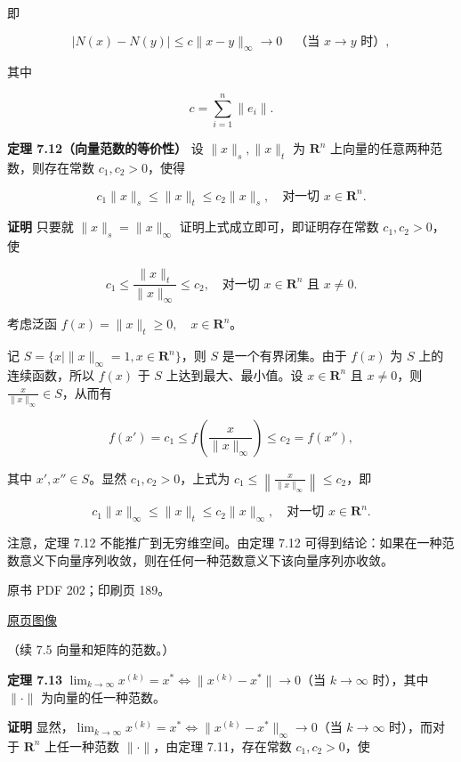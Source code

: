 \documentclass[
  10pt,
  fontset=fandol]{ctexart}
\begin{document}
即

\[
|N(x)-N(y)|\leqslant c\|x-y\|_\infty\to0\quad\text{（当 }x\to y\text{ 时）},
\]

其中

\[
c=\sum_{i=1}^{n}\|e_i\|.
\]

\textbf{定理 7.12（向量范数的等价性）} 设 \(\|x\|_s,\|x\|_t\) 为
\(\mathbf R^n\) 上向量的任意两种范数，则存在常数 \(c_1,c_2>0\)，使得

\[
c_1\|x\|_s\leqslant\|x\|_t\leqslant c_2\|x\|_s,\quad\text{对一切 }x\in\mathbf R^n.
\]

\textbf{证明} 只要就 \(\|x\|_s=\|x\|_\infty\)
证明上式成立即可，即证明存在常数 \(c_1,c_2>0\)，使

\[
c_1\leqslant\frac{\|x\|_t}{\|x\|_\infty}\leqslant c_2,\quad\text{对一切 }x\in\mathbf R^n\text{ 且 }x\neq0.
\]

考虑泛函 \(f(x)=\|x\|_t\geqslant0,\quad x\in\mathbf R^n\)。

记 \(S=\{x\mid\|x\|_\infty=1,x\in\mathbf R^n\}\)，则 \(S\)
是一个有界闭集。由于 \(f(x)\) 为 \(S\) 上的连续函数，所以 \(f(x)\) 于
\(S\) 上达到最大、最小值。设 \(x\in\mathbf R^n\) 且 \(x\neq0\)，则
\(\frac{x}{\|x\|_\infty}\in S\)，从而有

\[
f(x')=c_1\leqslant f\left(\frac{x}{\|x\|_\infty}\right)\leqslant c_2=f(x''),
\tag{7.5.3}
\]

其中 \(x',x''\in S\)。显然 \(c_1,c_2>0\)，上式为
\(c_1\leqslant\left\|\frac{x}{\|x\|_\infty}\right\|\leqslant c_2\)，即

\[
c_1\|x\|_\infty\leqslant\|x\|_t\leqslant c_2\|x\|_\infty,\quad\text{对一切 }x\in\mathbf R^n.
\]

注意，定理 7.12 不能推广到无穷维空间。由定理 7.12
可得到结论：如果在一种范数意义下向量序列收敛，则在任何一种范数意义下该向量序列亦收敛。

\clearpage

原书 PDF 202；印刷页 189。

\href{../../../source-images/pdf-202.jpeg}{原页图像}

（续 7.5 向量和矩阵的范数。）

\textbf{定理 7.13}
\(\lim_{k\to\infty}x^{(k)}=x^*\Longleftrightarrow\|x^{(k)}-x^*\|\to0\)（当
\(k\to\infty\) 时），其中 \(\|\cdot\|\) 为向量的任一种范数。

\textbf{证明}
显然，\(\lim_{k\to\infty}x^{(k)}=x^*\Longleftrightarrow\|x^{(k)}-x^*\|_\infty\to0\)（当
\(k\to\infty\) 时），而对于 \(\mathbf R^n\) 上任一种范数
\(\|\cdot\|\)，由定理 7.11，存在常数 \(c_1,c_2>0\)，使
\end{document}
